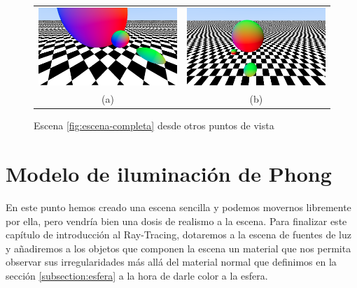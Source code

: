 \begin{figure}[ht]
    \centering
    \begin{tabular}{cc}
          \includegraphics[scale=0.25]{img/C7/camera-1.png} &   \includegraphics[scale=0.25]{img/C7/camera-2.png} \\
    (a) & (b)\\[6pt]
    \end{tabular}
    \caption{Escena \ref{fig:escena-completa} desde otros puntos de vista}
    \label{fig:escena-camara}
\end{figure}

\section{Modelo de iluminación de Phong}
\label{section:Phong}
En este punto hemos creado una escena sencilla y podemos movernos libremente por ella, pero vendría bien una dosis de realismo a la escena. Para finalizar este capítulo de introducción al Ray-Tracing, dotaremos a la escena de fuentes de luz y añadiremos a los objetos que componen la escena un material que nos permita observar sus irregularidades más allá del material normal que definimos en la sección \ref{subsection:esfera} a la hora de darle color a la esfera.


